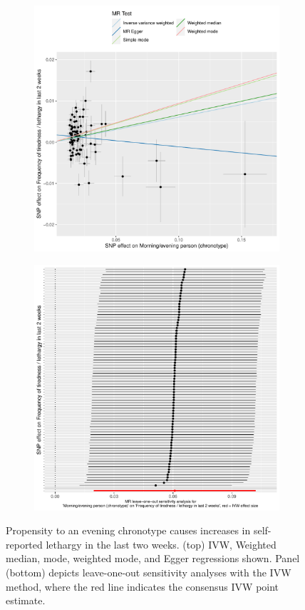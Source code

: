 \documentclass{article}
\begin{document}
% 
\begin{figure}[htbp]
\begin{subfigure}{\linewidth}
\centering
	\includegraphics[width=.8\linewidth]{Figs/Analysis2/Morning_evening_person_(chronotype)_vs_Frequency_of_tiredness___lethargy_in_last_2_weeks.Scatterplots.pdf}
\label{lethargyScatter}
\end{subfigure}
\begin{subfigure}{\linewidth}
\centering
	\includegraphics[width=.8\linewidth,keepaspectratio]{Figs/Analysis2/Morning_evening_person_(chronotype)_vs_Frequency_of_tiredness___lethargy_in_last_2_weeks.LOOplots.pdf}
\label{lethargyLoo}
\end{subfigure}
\caption{Propensity to an evening chronotype causes increases in self-reported lethargy in the last two weeks. (top) IVW, Weighted median, mode, weighted mode, and Egger regressions shown. Panel (bottom) depicts leave-one-out sensitivity analyses with the IVW method, where the red line indicates the consensus IVW point estimate.}
\label{lethargy}
\end{figure}
\end{document}
